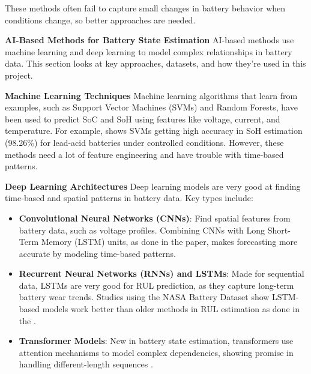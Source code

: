 These methods often fail to capture small changes in battery behavior when conditions change, so better approaches are needed.

\textbf{AI-Based Methods for Battery State Estimation}
\label{subsec:ai_methods}
AI-based methods use machine learning and deep learning to model complex relationships in battery data. This section looks at key approaches, datasets, and how they're used in this project.

\textbf{Machine Learning Techniques}
\label{subsec:ml_techniques}
Machine learning algorithms that learn from examples, such as Support Vector Machines (SVMs) and Random Forests, have been used to predict SoC and SoH using features like voltage, current, and temperature. For example, \cite{sun_simultaneous_2022} shows SVMs getting high accuracy in SoH estimation (98.26\%) for lead-acid batteries under controlled conditions. However, these methods need a lot of feature engineering and have trouble with time-based patterns.

\textbf{Deep Learning Architectures}
\label{subsec:deep_learning}
Deep learning models are very good at finding time-based and spatial patterns in battery data. Key types include:
\begin{itemize}
    \item \textbf{Convolutional Neural Networks (CNNs)}: Find spatial features from battery data, such as voltage profiles. Combining CNNs with Long Short-Term Memory (LSTM) units, as done in the \cite{Fangfang_Yang} paper, makes forecasting more accurate by modeling time-based patterns.
    \item \textbf{Recurrent Neural Networks (RNNs) and LSTMs}: Made for sequential data, LSTMs are very good for RUL prediction, as they capture long-term battery wear trends. Studies using the NASA Battery Dataset \cite{noauthor_nasa_nodate} show LSTM-based models work better than older methods in RUL estimation as done in the \cite{hong_state--health_2023}.
    \item \textbf{Transformer Models}: New in battery state estimation, transformers use attention mechanisms to model complex dependencies, showing promise in handling different-length sequences \cite{yilmaz_transformer-based_2025}.
\end{itemize}

